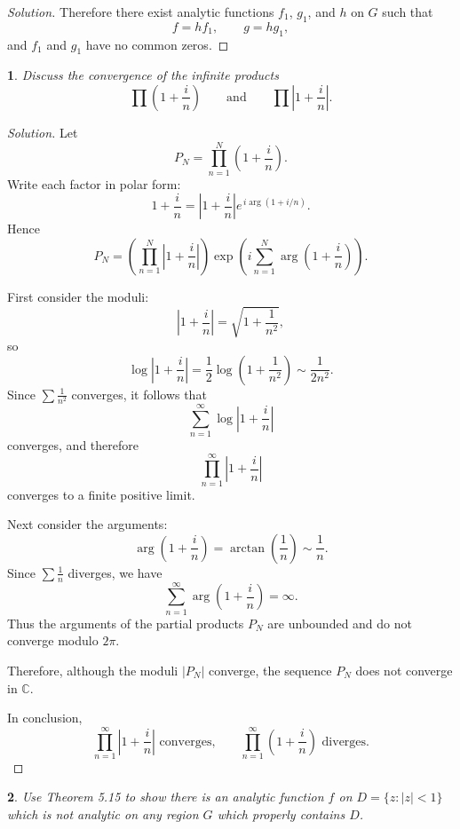 \documentclass[12pt, a4paper]{report}
\theoremstyle{spaced}
\newtheorem{exercise}{}
\newcommand{\setexercise}[1]{\setcounter{exercise}{#1-1}}
\begin{document}
\begin{proof}[Solution]
	Therefore there exist analytic functions \(f_1\), \(g_1\), and \(h\) on \(G\) such that
	\[
		f=hf_1,\qquad g=hg_1,
	\]
	and \(f_1\) and \(g_1\) have no common zeros.
\end{proof}

\setexercise{6}
\begin{exercise}
	Discuss the convergence of the infinite products
	\[
		\prod \left(1+\frac{i}{n}\right)
		\qquad \text{and} \qquad
		\prod \left|1+\frac{i}{n}\right|.
	\]
\end{exercise}

\begin{proof}[Solution]
	Let
	\[
		P_N=\prod_{n=1}^N\left(1+\frac{i}{n}\right).
	\]
	Write each factor in polar form:
	\[
		1+\frac{i}{n}
		=\left|1+\frac{i}{n}\right|e^{\,i\arg(1+i/n)}.
	\]
	Hence
	\[
		P_N
		=\left(\prod_{n=1}^N \left|1+\frac{i}{n}\right|\right)
		\exp\!\left(i\sum_{n=1}^N \arg\left(1+\frac{i}{n}\right)\right).
	\]

	First consider the moduli:
	\[
		\left|1+\frac{i}{n}\right|=\sqrt{1+\frac{1}{n^2}},
	\]
	so
	\[
		\log\left|1+\frac{i}{n}\right|
		=\frac{1}{2}\log\left(1+\frac{1}{n^2}\right)\sim \frac{1}{2n^2}.
	\]
	Since $\sum \frac{1}{n^2}$ converges, it follows that
	\[
		\sum_{n=1}^\infty \log\left|1+\frac{i}{n}\right|
	\]
	converges, and therefore
	\[
		\prod_{n=1}^\infty \left|1+\frac{i}{n}\right|
	\]
	converges to a finite positive limit.

	Next consider the arguments:
	\[
		\arg\left(1+\frac{i}{n}\right)=\arctan\left(\frac{1}{n}\right)\sim \frac{1}{n}.
	\]
	Since $\sum \frac{1}{n}$ diverges, we have
	\[
		\sum_{n=1}^\infty \arg\left(1+\frac{i}{n}\right)=\infty.
	\]
	Thus the arguments of the partial products $P_N$ are unbounded and do not converge modulo $2\pi$.

	Therefore, although the moduli $\lvert P_N\rvert$ converge, the sequence $P_N$ does not converge in $\mathbb{C}$.

	In conclusion,
	\[
		\prod_{n=1}^\infty \left|1+\frac{i}{n}\right| \text{ converges,}
		\qquad
		\prod_{n=1}^\infty \left(1+\frac{i}{n}\right) \text{ diverges.}
	\]
\end{proof}

\setexercise{9}
\begin{exercise}
	Use Theorem 5.15 to show there is an analytic function $f$ on
	\(
	D=\{z: |z|<1\}
	\)
	which is not analytic on any region $G$ which properly contains $D$.
\end{exercise}
\end{document}
